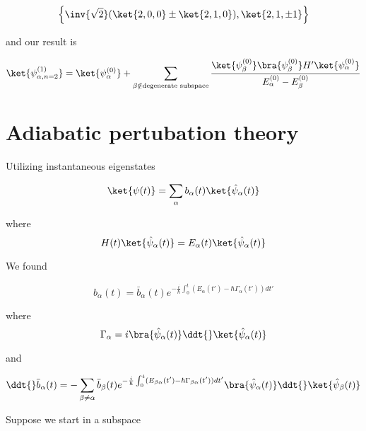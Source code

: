 \begin{equation}\label{eqn:qmTwoR3:350}
\left\{
\inv{\sqrt{2}}
( 
\ket{2,0,0} 
\pm 
\ket{2,1,0} 
), 
\ket{2, 1, \pm 1}
\right\}
\end{equation}

and our result is

\begin{equation}\label{eqn:qmTwoR3:370}
\ket{\psi_{\alpha, n=2}^{(1)}} = 
\ket{\psi_{\alpha}^{(0)}} 
+\sum_{\beta \notin \text{degenerate subspace}} \frac{ 
\ket{\psi_\beta^{(0)}} \bra{\psi_\beta^{(0)}} H' \ket{\psi_\alpha^{(0)}} 
}{
E_\alpha^{(0)} 
-E_\beta^{(0)} 
}
\end{equation}

\section{Adiabatic pertubation theory}

Utilizing instantaneous eigenstates

\begin{equation}\label{eqn:qmTwoR3:390}
\ket{\psi(t)} = \sum_{\alpha} b_\alpha(t) \ket{\hat{\psi}_\alpha(t)}
\end{equation}

where
\begin{equation}\label{eqn:qmTwoR3:410}
H(t) \ket{\hat{\psi}_\alpha(t)}
= E_\alpha(t) \ket{\hat{\psi}_\alpha(t)}
\end{equation}

We found

\begin{equation}\label{eqn:qmTwoR3:430}
b_\alpha(t) = \bar{b}_\alpha(t) e^{-\frac{i}{\hbar} \int_0^t (E_\alpha(t') - \hbar \Gamma_\alpha(t')) dt'}
\end{equation}

where
\begin{equation}\label{eqn:qmTwoR3:450}
\Gamma_\alpha = i
\bra{\hat{\psi}_\alpha(t)}
\ddt{} \ket{\hat{\psi}_\alpha(t)}
\end{equation}

and

\begin{equation}\label{eqn:qmTwoR3:470}
\ddt{}\bar{b}_\alpha(t)
=
-\sum_{\beta \ne \alpha} \bar{b}_\beta(t)
e^{-\frac{i}{\hbar} \int_0^t (E_{\beta\alpha}(t') - \hbar \Gamma_{\beta\alpha}(t')) dt'}
\bra{\hat{\psi}_\alpha(t)}
\ddt{} \ket{\hat{\psi}_\beta(t)}
\end{equation}

Suppose we start in a subspace 

